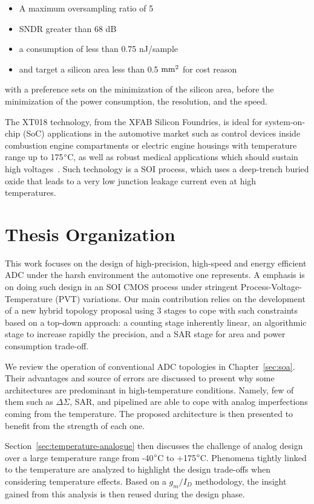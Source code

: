 \begin{itemize}
	\item A maximum oversampling ratio of 5
	\item SNDR greater than 68 dB
	\item a consumption of less than 0.75 nJ/sample
	\item and target a silicon area less than 0.5 \(\rm mm^2 \) for cost reason
\end{itemize}

with a preference sets on the minimization of the silicon area, before the minimization of the power consumption, the resolution, and the speed.

The XT018 technology, from the XFAB Silicon Foundries, is ideal for system-on-chip (SoC) applications in the automotive market such as control devices inside combustion engine compartments or electric engine housings with temperature range up to 175$\degree$C, as well as robust medical applications which should sustain high voltages~\cite{XT018XFab}. Such technology is a SOI process, which uses a deep-trench buried oxide that leads to a very low junction leakage current even at high temperatures.

\section{Thesis Organization}

This work focuses on the design of high-precision, high-speed and energy efficient ADC under the harsh environment the automotive one represents. A emphasis is on doing such design in an SOI CMOS process under stringent Process-Voltage-Temperature (PVT) variations. Our main contribution relies on the development of a new hybrid topology proposal using 3 stages to cope with such constraints based on a top-down approach: a counting stage inherently linear, an algorithmic stage to increase rapidly the precision, and a SAR stage for area and power consumption trade-off.

We review the operation of conventional ADC topologies in Chapter~\ref{sec:soa}. Their advantages and source of errors are discussed to present why some architectures are predominant in high-temperature conditions. Namely, few of them such as \(\Delta \Sigma\), SAR, and pipelined are able to cope with analog imperfections coming from the temperature. The proposed architecture is then presented to benefit from the strength of each one.

Section~\ref{sec:temperature-analogue} then discusses the challenge of analog design over a large temperature range from -40\(\degree\)C to +175\(\degree\)C. Phenomena tightly linked to the temperature are analyzed to highlight the design trade-offs when considering temperature effects. Based on a \(g_m/I_D\) methodology, the insight gained from this analysis is then reused during the design phase.

